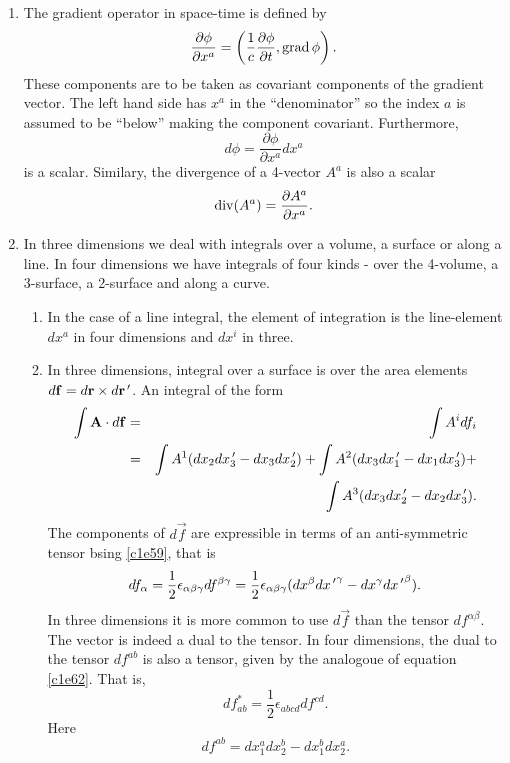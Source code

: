 \begin{enumerate}
\item The gradient operator in space-time is defined by
\begin{equation}\label{c1e65}
\frac{\partial\phi}{\partial x^a} = 
\left(\frac{1}{c}\frac{\partial\phi}{\partial t}, \operatorname{grad}\phi\right).
\end{equation}
These components are to be taken as covariant components of the gradient vector.
The left hand side has $x^a$ in the ``denominator'' so the index $a$ is assumed
to be ``below'' making the component covariant. Furthermore,
\begin{equation}\label{c1e66}
d\phi = \frac{\partial\phi}{\partial x^a}dx^a
\end{equation}
is a scalar. Similary, the divergence of a 4-vector $A^a$ is also a scalar
\begin{equation}\label{c1e67}
\operatorname{div}(A^a) = \frac{\partial A^a}{\partial x^a}.
\end{equation}

\item In three dimensions we deal with integrals over a volume, a surface or
along a line. In four dimensions we have integrals of four kinds - over the
4-volume, a 3-surface, a 2-surface and along a curve.
\begin{enumerate}
\item In the case of a line integral, the element of integration is the 
line-element $dx^a$ in four dimensions and $dx^i$ in three.

\item In three dimensions, integral over a surface is over the area elements 
$d\mathbf{f} = d\mathbf{r} \times d\mathbf{r}^{\,\prime}$. An integral of the form
\begin{eqnarray*}
\int \mathbf{A}\cdot d\mathbf{f} &=& \int A^i df_i \\
 &=& \int A^1(dx_2dx_3^{\,\prime} - dx_3dx_2^{\,\prime}) + 
     \int A^2(dx_3dx_1^{\,\prime} - dx_1dx_3^{\,\prime}) + \\
 & & \int A^3(dx_3dx_2^{\,\prime} - dx_2dx_3^{\,\prime}).
\end{eqnarray*}
The components of $d\vec{f}$ are expressible in terms of an anti-symmetric 
tensor bsing \eqref{c1e59}, that is
\begin{equation}\label{c1e68}
df_\alpha = \frac{1}{2}\epsilon_{\alpha\beta\gamma}df^{\beta\gamma} = 
\frac{1}{2}\epsilon_{\alpha\beta\gamma}(dx^\beta d{x^{\,\prime}}^\gamma - 
dx^\gamma d{x^{\,\prime}}^\beta).
\end{equation}
In three dimensions it is more common to use $d\vec{f}$ than the tensor 
$df^{\alpha\beta}$.  The vector is indeed a dual to the tensor. In four 
dimensions, the dual to the tensor $df^{ab}$ is also a tensor, given by the 
analogoue of equation \eqref{c1e62}. 
That is,
\begin{equation}\label{c1e69}
df^\ast_{ab} = \frac{1}{2}\epsilon_{abcd}df^{cd}.
\end{equation}
Here
\begin{equation}\label{c1e70}
df^{ab} = dx_1^a dx_2^b - dx_1^b dx_2^a.
\end{equation}


\end{enumerate}
\end{enumerate}

